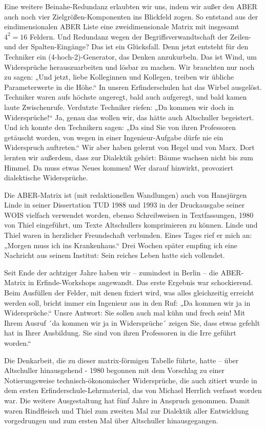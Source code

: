 \documentclass[12pt,a4paper]{article}
\begin{document}
Eine weitere Beinahe-Redundanz erlaubten wir uns, indem wir außer den ABER auch
noch vier Zielgrößen-Komponenten ins Blickfeld zogen. So entstand aus der
eindimensionalen ABER Liste eine zweidimensionale Matrix mit insgesamt $4^2=16$
Feldern. Und Redundanz wegen der Begriffsverwandtschaft der Zeilen- und der
Spalten-Eingänge? Das ist ein Glücksfall. Denn jetzt entsteht für den Techniker
ein (4-hoch-2)-Generator, das Denken anzukurbeln. Das ist Wind, um Widersprüche
herauszuarbeiten und lösbar zu machen. Wir brauchten nur noch zu sagen: „Und
jetzt, liebe Kolleginnen und Kollegen, treiben wir übliche Parameterwerte in
die Höhe.“ In unsren Erfinderschulen hat das Wirbel ausgelöst. Techniker waren
aufs höchste angeregt, bald auch aufgeregt, und bald kamen laute Zwischenrufe.
Verdutzte Techniker riefen: „Da kommen wir doch in Widersprüche!“ Ja, genau das
wollen wir, das hätte auch Altschuller begeistert. Und ich konnte den
Technikern sagen: „Da sind Sie von ihren Professoren getäuscht worden, von
wegen in einer Ingenieur-Aufgabe dürfe nie ein Widerspruch auftreten.“ Wir aber
haben gelernt von Hegel und von Marx. Dort lernten wir außerdem, dass zur
Dialektik gehört: Bäume wachsen nicht bis zum Himmel. Da muss etwas Neues
kommen! Wer darauf hinwirkt, provoziert dialektische Widersprüche.

Die ABER-Matrix ist (mit redaktionellen Wandlungen) auch von Hansjürgen Linde
in seiner Dissertation TUD 1988 und 1993 in der Druckausgabe seiner WOIS
vielfach verwendet worden, ebenso Schreibweisen in Textfassungen, 1980 von
Thiel eingeführt, um Texte Altschullers komprimieren zu können. Linde und Thiel
waren in herzlicher Freundschaft verbunden. Eines Tages rief er mich an:
„Morgen muss ich ins Krankenhaus.“ Drei Wochen später empfing ich eine
Nachricht aus seinem Institut: Sein reiches Leben hatte sich vollendet.

Seit Ende der achtziger Jahre haben wir – zumindest in Berlin – die ABER-Matrix
in Erfinde-Workshops angewandt. Das erste Ergebnis war schockierend. Beim
Ausfüllen der Felder, mit denen fixiert wird, was alles gleichzeitig erreicht
werden soll, bricht immer ein Ingenieur aus in den Ruf: „Da kommen wir ja in
Widersprüche.“ Unsre Antwort: Sie sollen auch mal kühn und frech sein! Mit
Ihrem Ausruf ´da kommen wir ja in Widersprüche´ zeigen Sie, dass etwas gefehlt
hat in Ihrer Ausbildung. Sie sind von ihren Professoren in die Irre geführt
worden.“

Die Denkarbeit, die zu dieser matrix-förmigen Tabelle führte, hatte – über
Altschuller hinausgehend - 1980 begonnen mit dem Vorschlag zu einer
Notierungsweise technisch-ökonomischer Widersprüche, die auch zitiert wurde in
dem ersten Erfinderschule-Lehrmaterial, das von Michael Herrlich verfasst
worden war. Die weitere Ausgestaltung hat fünf Jahre in Anspruch genommen.
Damit waren Rindfleisch und Thiel zum zweiten Mal zur Dialektik aller
Entwicklung vorgedrungen und zum ersten Mal über Altschuller hinausgegangen.
\end{document}

